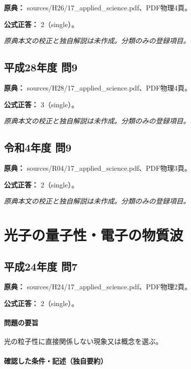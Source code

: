 \noindent\textbf{原典：} sources/H26/17\_applied\_science.pdf、PDF物理4頁。

\textbf{公式正答：} 2（single）。

\par\textit{原典本文の校正と独自解説は未作成。分類のみの登録項目。}

\subsection{平成28年度 問9}
\label{q:h28-reg-applied-09}

\noindent\textbf{原典：} sources/H28/17\_applied\_science.pdf、PDF物理4頁。

\textbf{公式正答：} 3（single）。

\par\textit{原典本文の校正と独自解説は未作成。分類のみの登録項目。}

\subsection{令和4年度 問9}
\label{q:r04-reg-applied-09}

\noindent\textbf{原典：} sources/R04/17\_applied\_science.pdf、PDF物理3頁。

\textbf{公式正答：} 2（single）。

\par\textit{原典本文の校正と独自解説は未作成。分類のみの登録項目。}

\section{光子の量子性・電子の物質波}

\subsection{平成24年度 問7}
\label{q:h24-reg-applied-07}

\noindent\textbf{原典：} sources/H24/17\_applied\_science.pdf、PDF物理2頁。

\textbf{公式正答：} 2（single）。

\paragraph{問題の要旨} 光の粒子性に直接関係しない現象又は概念を選ぶ。

\paragraph{確認した条件・記述（独自要約）}\mbox{}\par

